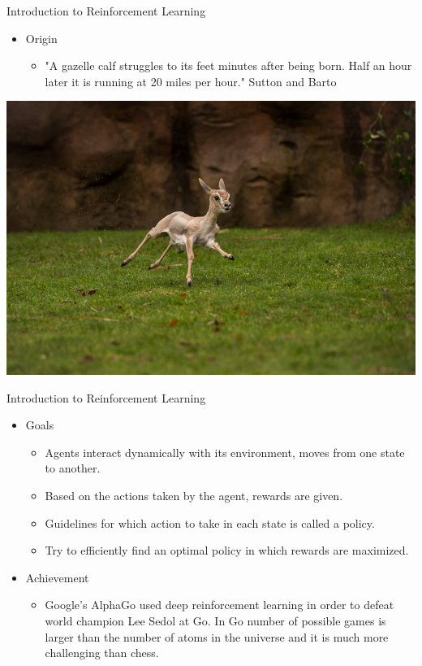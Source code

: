 \documentclass{beamer}
\begin{document}
\begin{frame}[t]{Introduction to Reinforcement Learning} %
\begin{itemize}
\item Origin
	\begin{itemize}
	\item "A gazelle calf struggles to its feet minutes after being born. Half an hour later it is running at 20 miles per hour." Sutton and Barto
	\end{itemize}
\end{itemize}
\begin{center}
\includegraphics[scale=0.20]{baby}
\end{center}
\end{frame}


\begin{frame}[t]{Introduction to Reinforcement Learning} %
\begin{itemize}
\item Goals
	\begin{itemize}
	\item Agents interact dynamically with its environment, moves from one state to another.
	\item Based on the actions taken by the agent, rewards are given.
	\item Guidelines for which action to take in each state is called a policy.
	\item Try to efficiently find an optimal policy in which rewards are maximized.
	\end{itemize}
\item Achievement
	\begin{itemize}
	\item Google's AlphaGo used deep reinforcement learning in order to defeat world champion Lee Sedol at Go. In Go number of possible games is larger than the number of atoms in the universe and it is much more challenging than chess.
	\end{itemize}
\end{itemize}
\end{frame}
\end{document}
